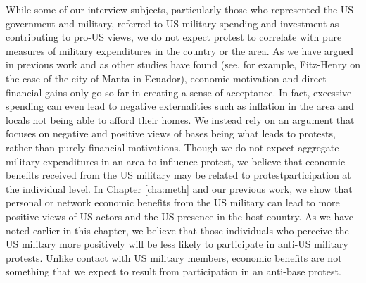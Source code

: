 		
		While some of our interview subjects, particularly those who represented the US government and military, referred to US military spending and investment as contributing to pro-US views, we do not expect protest to correlate with pure measures of military expenditures in the country or the area.\cite[For example, an interview subject at the US embassy in Panama attributed the high level of acceptance for the US in Panama to long-term and widespread US investment in Panamanian infrastructure.][]{embthree20180712}  As we have argued in previous work and as other studies have found (see, for example, Fitz-Henry on the case of the city of Manta in Ecuador),\cite{Fitz2015} economic motivation and direct financial gains only go so far in creating a sense of acceptance.\cite{Allen2020}  In fact, excessive spending can even lead to negative externalities such as inflation in the area and locals not being able to afford their homes.\cite{Hohn2010,Fitz2015}  We instead rely on an argument that focuses on negative and positive views of bases being what leads to protests, rather than purely financial motivations.
		Though we do not expect aggregate military expenditures in an area to influence protest, we believe that economic benefits received from the US military may be related to protestparticipation at the individual level. In Chapter \ref{cha:meth} and our previous work, we show that personal or network economic benefits from the US military can lead to more positive views of US actors and the US presence in the host country.\cite{Allen2020} As we have noted earlier in this chapter, we believe that those individuals who perceive the US military more positively will be less likely to participate in anti-US military protests. Unlike contact with US military members, economic benefits are not something that we expect to result from participation in an anti-base protest. 
		
		
		
		
